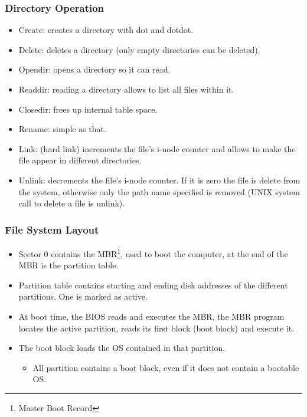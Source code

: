 \begin{frame}
  \frametitle{Directory Operation}
    \begin{itemize}
      \item Create: creates a directory with dot and dotdot.
      \item Delete: deletes a directory (only empty directories can be deleted).
      \item Opendir: opens a directory so it can read.
      \item Readdir: reading a directory allows to list all files within it.
      \item Closedir: frees up internal table space.
      \item Rename: simple as that.
      \item Link: (hard link) increments the file's i-node counter and allows to make the file appear in different directories.
      \item Unlink: decrements the file's i-node counter. If it is zero the file is delete from the system, otherwise only the path name specified is removed (UNIX system call to delete a file is unlink).
    \end{itemize}
\end{frame}

\begin{frame}
  \frametitle{File System Layout}
    \begin{itemize}
      \item Sector 0 contains the MBR\footnote{Master Boot Record}, used to boot the computer, at the end of the MBR is the partition table.
      \item Partition table contains starting and ending disk addresses of the different partitions. One is marked as active.
      \item At boot time, the BIOS reads and executes the MBR, the MBR program locates the active partition, reads its first block (boot block) and execute it.
      \item The boot block loads the OS contained in that partition.
        \begin{itemize}
          \item All partition contains a boot block, even if it does not contain a bootable OS.
        \end{itemize}
  \end{itemize}
\end{frame}

